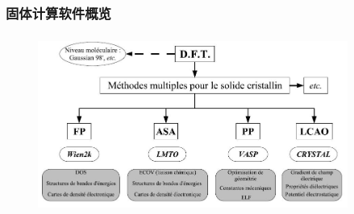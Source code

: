 {\frame
{
	\frametitle{固体计算软件概览}
\begin{figure}[h!]
\centering
\vspace*{-0.05in}
\includegraphics[height=2.30in,width=4.00in,viewport=0 0 920 500,clip]{Figures/DFT-Software.jpg}
\label{Abinitio-Softwares}
\end{figure}
}

}
